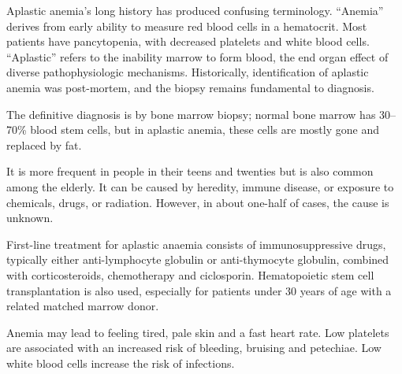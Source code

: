 Aplastic anemia's long history has produced confusing terminology. “Anemia” derives from early ability to measure red blood cells in a hematocrit. Most patients have pancytopenia, with decreased platelets and white blood cells. “Aplastic” refers to the inability marrow to form blood, the end organ effect of diverse pathophysiologic mechanisms. Historically, identification of aplastic anemia was post-mortem, and the biopsy remains fundamental to diagnosis.\cite{longo2018aplastic}\cite{peslak2017diagnosis}

The definitive diagnosis is by bone marrow biopsy; normal bone marrow has 30–70\% blood stem cells, but in aplastic anemia, these cells are mostly gone and replaced by fat.\cite{fauci2015harrison}\cite{porter2011merck}

It is more frequent in people in their teens and twenties but is also common among the elderly. It can be caused by heredity, immune disease, or exposure to chemicals, drugs, or radiation. However, in about one-half of cases, the cause is unknown.\cite{fauci2015harrison}\cite{porter2011merck}

First-line treatment for aplastic anaemia consists of immunosuppressive drugs, typically either anti-lymphocyte globulin or anti-thymocyte globulin, combined with corticosteroids, chemotherapy and ciclosporin. Hematopoietic stem cell transplantation is also used, especially for patients under 30 years of age with a related matched marrow donor.\cite{fauci2015harrison}\cite{porter2011merck}

Anemia may lead to feeling tired, pale skin and a fast heart rate. Low platelets are associated with an increased risk of bleeding, bruising and petechiae. Low white blood cells increase the risk of infections.
